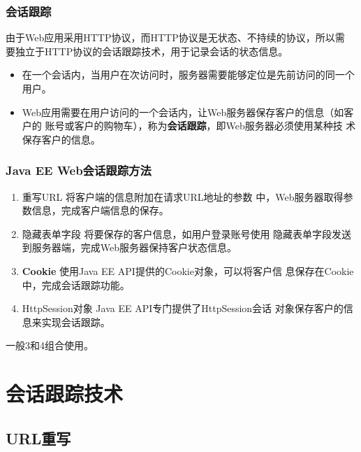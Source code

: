\begin{frame}[fragile] %
  \frametitle{会话跟踪} 


  {\kai 由于Web应用采用HTTP协议，而HTTP协议是无状态、不持续的协议，所以需
    要独立于HTTP协议的会话跟踪技术，用于记录会话的状态信息。}


  \begin{itemize}
  \item 在一个会话内，当用户在次访问时，服务器需要能够定位是先前访问的同一个用户。
  \item Web应用需要在用户访问的一个会话内，让Web服务器保存客户的信息（如客户的
    账号或客户的购物车），称为{\bf\Red 会话跟踪}，即Web服务器必须使用某种技
    术保存客户的信息。
  \end{itemize}
\end{frame}

\begin{frame}[fragile] %
  \frametitle{Java EE Web会话跟踪方法} 

  \begin{enumerate}\kai
  \item {\hei\Red 重写URL} 将客户端的信息附加在请求URL地址的参数
    中，Web服务器取得参数信息，完成客户端信息的保存。
  \item {\hei\Red 隐藏表单字段} 将要保存的客户信息，如用户登录账号使用
    隐藏表单字段发送到服务器端，完成Web服务器保持客户状态信息。
  \item {\bf\Red Cookie} 使用Java EE API提供的Cookie对象，可以将客户信
    息保存在Cookie中，完成会话跟踪功能。
  \item {\hei\Red HttpSession对象} Java EE API专门提供了HttpSession会话
    对象保存客户的信息来实现会话跟踪。
  \end{enumerate}

  一般3和4组合使用。
\end{frame}

\section{会话跟踪技术}

\subsection{URL重写}

